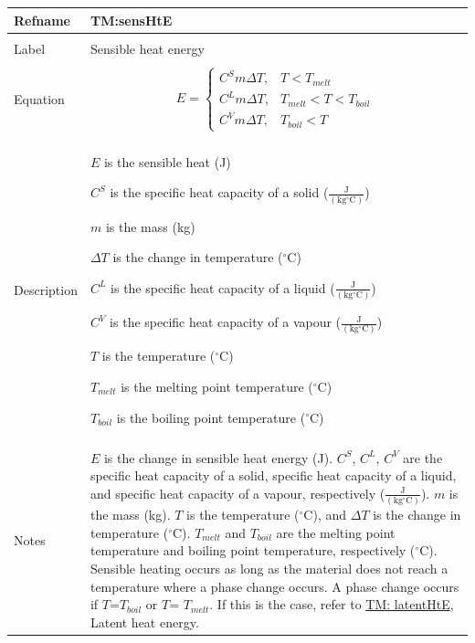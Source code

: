\documentclass[12pt]{article}
\begin{document}
\noindent \begin{minipage}{\textwidth}
\begin{tabular}{p{} p{}}
\toprule \textbf{Refname} & \textbf{TM:sensHtE}
\label{TM:sensHtE}
\\ \midrule \\
Label & Sensible heat energy
\\ \midrule \\
Equation & \begin{displaymath}
           E=\begin{cases}
{C^{S}} m ΔT, & T<{T_{melt}}\\
{C^{L}} m ΔT, & {T_{melt}}<T<{T_{boil}}\\
{C^{V}} m ΔT, & {T_{boil}}<T
\end{cases}
           \end{displaymath}
\\ \midrule \\
Description & \begin{symbDescription}
              \item{$E$ is the sensible heat (J)}
              \item{${C^{S}}$ is the specific heat capacity of a solid ($\frac{\text{J}}{(\text{kg}{}^{\circ}\text{C})}$)}
              \item{$m$ is the mass (kg)}
              \item{$ΔT$ is the change in temperature (${}^{\circ}$C)}
              \item{${C^{L}}$ is the specific heat capacity of a liquid ($\frac{\text{J}}{(\text{kg}{}^{\circ}\text{C})}$)}
              \item{${C^{V}}$ is the specific heat capacity of a vapour ($\frac{\text{J}}{(\text{kg}{}^{\circ}\text{C})}$)}
              \item{$T$ is the temperature (${}^{\circ}$C)}
              \item{${T_{melt}}$ is the melting point temperature (${}^{\circ}$C)}
              \item{${T_{boil}}$ is the boiling point temperature (${}^{\circ}$C)}
              \end{symbDescription}
\\ \midrule \\
Notes & $E$ is the change in sensible heat energy (J). ${C^{S}}$, ${C^{L}}$, ${C^{V}}$ are the specific heat capacity of a solid, specific heat capacity of a liquid, and specific heat capacity of a vapour, respectively ($\frac{\text{J}}{(\text{kg}{}^{\circ}\text{C})}$). $m$ is the mass (kg). $T$ is the temperature (${}^{\circ}$C), and $ΔT$ is the change in temperature (${}^{\circ}$C). ${T_{melt}}$ and ${T_{boil}}$ are the melting point temperature and boiling point temperature, respectively (${}^{\circ}$C). Sensible heating occurs as long as the material does not reach a temperature where a phase change occurs. A phase change occurs if $T$=${T_{boil}}$ or $T$= ${T_{melt}}$. If this is the case, refer to \hyperref[TM:latentHtE]{TM: latentHtE}, Latent heat energy.

\end{tabular}
\end{minipage}
\end{document}
